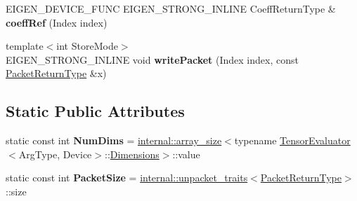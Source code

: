 \begin{DoxyCompactItemize}
\item 
\mbox{\label{struct_eigen_1_1_tensor_evaluator_3_01_tensor_shuffling_op_3_01_shuffle_00_01_arg_type_01_4_00_01_device_01_4_a3ef6dd4d4cae360e010bfde3bed03a43}} 
E\+I\+G\+E\+N\+\_\+\+D\+E\+V\+I\+C\+E\+\_\+\+F\+U\+NC E\+I\+G\+E\+N\+\_\+\+S\+T\+R\+O\+N\+G\+\_\+\+I\+N\+L\+I\+NE Coeff\+Return\+Type \& {\bfseries coeff\+Ref} (Index index)
\item 
\mbox{\label{struct_eigen_1_1_tensor_evaluator_3_01_tensor_shuffling_op_3_01_shuffle_00_01_arg_type_01_4_00_01_device_01_4_a9e7da98c27399c74f5459daedb0ec8e2}} 
{\footnotesize template$<$int Store\+Mode$>$ }\\E\+I\+G\+E\+N\+\_\+\+S\+T\+R\+O\+N\+G\+\_\+\+I\+N\+L\+I\+NE void {\bfseries write\+Packet} (Index index, const \hyperlink{group___sparse_core___module}{Packet\+Return\+Type} \&x)
\end{DoxyCompactItemize}
\subsection*{Static Public Attributes}
\begin{DoxyCompactItemize}
\item 
\mbox{\label{struct_eigen_1_1_tensor_evaluator_3_01_tensor_shuffling_op_3_01_shuffle_00_01_arg_type_01_4_00_01_device_01_4_ab02f916774ab633f5244de6cc1c62f1d}} 
static const int {\bfseries Num\+Dims} = \hyperlink{struct_eigen_1_1internal_1_1array__size}{internal\+::array\+\_\+size}$<$typename \hyperlink{struct_eigen_1_1_tensor_evaluator}{Tensor\+Evaluator}$<$Arg\+Type, Device$>$\+::\hyperlink{struct_eigen_1_1_d_sizes}{Dimensions}$>$\+::value
\item 
\mbox{\label{struct_eigen_1_1_tensor_evaluator_3_01_tensor_shuffling_op_3_01_shuffle_00_01_arg_type_01_4_00_01_device_01_4_ad7ef3d1f78b1152e937cafca1df13807}} 
static const int {\bfseries Packet\+Size} = \hyperlink{struct_eigen_1_1internal_1_1unpacket__traits}{internal\+::unpacket\+\_\+traits}$<$\hyperlink{group___sparse_core___module}{Packet\+Return\+Type}$>$\+::size
\end{DoxyCompactItemize}
